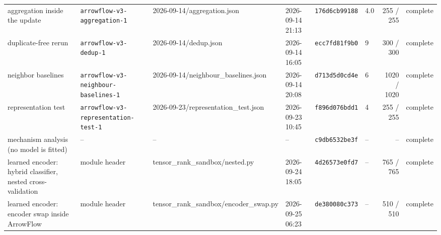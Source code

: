 \begin{landscape}
\begin{longtable}{p{125pt}p{120pt}p{120pt}p{65pt}llrl}
aggregation inside the update & \texttt{arrowflow-\allowbreak v3-aggregation-1} & 2026-09-14/aggregation.json & 2026-09-14 21:13 & \texttt{176d6cb99188} & 4.0 & 255 / 255 & complete \\
duplicate-free rerun & \texttt{arrowflow-\allowbreak v3-dedup-1} & 2026-09-14/dedup.json & 2026-09-14 16:05 & \texttt{ecc7fd81f9b0} & 9 & 300 / 300 & complete \\
neighbor baselines & \texttt{arrowflow-\allowbreak v3-neighbour-baselines-1} & 2026-09-14/neighbour\_baselines.json & 2026-09-14 20:08 & \texttt{d713d5d0cd4e} & 6 & 1020 / 1020 & complete \\
representation test & \texttt{arrowflow-\allowbreak v3-representation-test-1} & 2026-09-23/representation\_test.json & 2026-09-23 10:45 & \texttt{f896d076bdd1} & 4 & 255 / 255 & complete \\
mechanism analysis (no model is fitted) & -- & -- & -- & \texttt{c9db6532be3f} & -- & -- & complete \\
learned encoder: hybrid classifier, nested cross-validation & module header & tensor\_\allowbreak rank\_\allowbreak sandbox/\allowbreak nested.py & 2026-09-24 18:05 & \texttt{4d26573e0fd7} & -- & 765 / 765 & complete \\
learned encoder: encoder swap inside ArrowFlow & module header & tensor\_\allowbreak rank\_\allowbreak sandbox/\allowbreak encoder\_\allowbreak swap.py & 2026-09-25 06:23 & \texttt{de380080c373} & -- & 510 / 510 & complete \\
\end{longtable}
\endgroup
\end{landscape}
